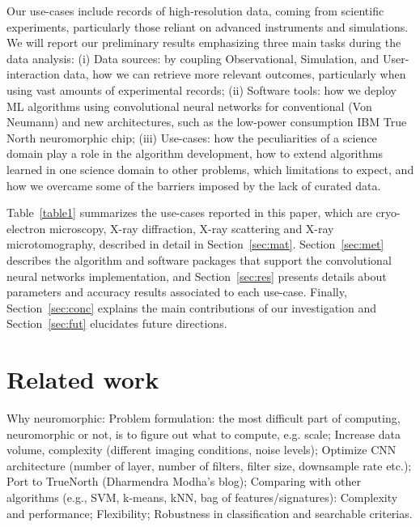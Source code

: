 Our use-cases include records of high-resolution data, coming from scientific experiments, particularly those reliant on advanced instruments and simulations. We will report our preliminary results emphasizing three main tasks during the data analysis:
(i) Data sources: by coupling Observational, Simulation, and User-interaction data, how we can retrieve more relevant outcomes, particularly when using vast amounts of experimental records; (ii) Software tools: how we deploy ML algorithms using convolutional neural networks for conventional (Von Neumann) and new architectures, such as the low-power consumption IBM True
North neuromorphic chip;
(iii) Use-cases: how the peculiarities of a science domain play a role in the algorithm development, how to extend algorithms learned in one science domain to other problems, which limitations to expect, and how we overcame some of the barriers imposed by the lack of curated data.

Table~\ref{table1} summarizes the use-cases reported in this paper, which are cryo-electron microscopy, X-ray diffraction, X-ray scattering and X-ray microtomography, described in detail in Section~\ref{sec:mat}. Section~\ref{sec:met} describes the algorithm and software packages that support the convolutional neural networks implementation, and Section~\ref{sec:res} presents details about parameters and accuracy results associated to each use-case. Finally, Section~\ref{sec:conc} explains the main contributions of our investigation and Section~\ref{sec:fut} elucidates future directions.




\section{Related work}
Why neuromorphic:
Problem formulation: the most difficult part of computing, neuromorphic or not, is to figure out what to compute, e.g. scale;
Increase data volume, complexity (different imaging conditions, noise levels);
Optimize CNN architecture (number of layer, number of filters, filter size, downsample rate etc.);
Port to TrueNorth (Dharmendra Modha’s blog);
Comparing with other algorithms (e.g., SVM, k-means, kNN, bag of features/signatures):
Complexity and performance;
Flexibility;
Robustness in classification and searchable criterias.
